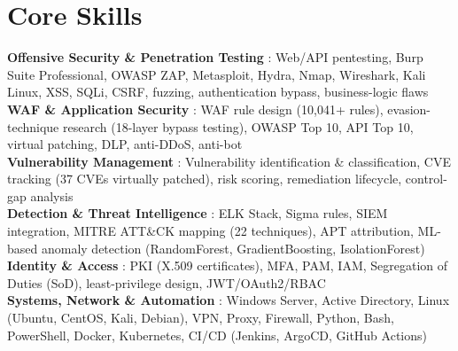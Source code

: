 \documentclass[a4paper,10pt]{article}
\begin{document}
\section{Core Skills}
\textbf{Offensive Security \& Penetration Testing} : Web/API pentesting, Burp Suite Professional, OWASP ZAP, Metasploit, Hydra, Nmap, Wireshark, Kali Linux, XSS, SQLi, CSRF, fuzzing, authentication bypass, business-logic flaws\\[1pt]
\textbf{WAF \& Application Security} : WAF rule design (10,041+ rules), evasion-technique research (18-layer bypass testing), OWASP Top 10, API Top 10, virtual patching, DLP, anti-DDoS, anti-bot\\[1pt]
\textbf{Vulnerability Management} : Vulnerability identification \& classification, CVE tracking (37 CVEs virtually patched), risk scoring, remediation lifecycle, control-gap analysis\\[1pt]
\textbf{Detection \& Threat Intelligence} : ELK Stack, Sigma rules, SIEM integration, MITRE ATT\&CK mapping (22 techniques), APT attribution, ML-based anomaly detection (RandomForest, GradientBoosting, IsolationForest)\\[1pt]
\textbf{Identity \& Access} : PKI (X.509 certificates), MFA, PAM, IAM, Segregation of Duties (SoD), least-privilege design, JWT/OAuth2/RBAC\\[1pt]
\textbf{Systems, Network \& Automation} : Windows Server, Active Directory, Linux (Ubuntu, CentOS, Kali, Debian), VPN, Proxy, Firewall, Python, Bash, PowerShell, Docker, Kubernetes, CI/CD (Jenkins, ArgoCD, GitHub Actions)
\end{document}
